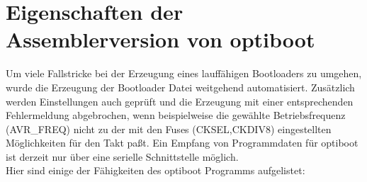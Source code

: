 \section{Eigenschaften der Assemblerversion von optiboot}

Um viele Fallstricke bei der Erzeugung eines lauffähigen Bootloaders zu umgehen,
wurde die Erzeugung der Bootloader Datei weitgehend automatisiert.
Zusätzlich werden Einstellungen auch geprüft und die Erzeugung mit
einer entsprechenden Fehlermeldung abgebrochen,
wenn beispielweise die gewählte Betriebsfrequenz (AVR\_FREQ) nicht zu der
mit den Fuses (CKSEL,CKDIV8) eingestellten Möglichkeiten für den Takt paßt.
Ein Empfang von Programmdaten für optiboot ist derzeit nur über eine serielle Schnittstelle möglich.\\

Hier sind einige der Fähigkeiten des optiboot Programms aufgelistet:

